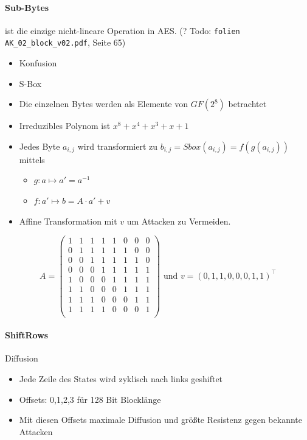 \paragraph{Sub-Bytes} ist die einzige nicht-lineare Operation in AES. (? Todo: \verb|folien AK_02_block_v02.pdf|, Seite 65)

\begin{itemize}
    \item Konfusion
    \item S-Box 
    \item Die einzelnen Bytes werden als Elemente von $GF(2^8)$ betrachtet
    \item Irreduzibles Polynom ist $x^8 + x^4 + x^3 + x + 1$
    \item Jedes Byte $a_{i,j}$ wird transformiert zu $b_{i,j} = Sbox(a_{i, j}) = f(g(a_{i,j}))$ mittels 
    \begin{itemize}
        \item $g: a \mapsto a' = a^{-1}$
        \item $f: a' \mapsto b = A\cdot a' + v$
    \end{itemize}
    \item Affine Transformation mit $v$ um Attacken zu Vermeiden. 
\end{itemize}

\begin{equation*}
    A = \begin{pmatrix}
        1 & 1 & 1 & 1 & 1 & 0 & 0 & 0\\
        0 & 1 & 1 & 1 & 1 & 1 & 0 & 0\\
        0 & 0 & 1 & 1 & 1 & 1 & 1 & 0\\
        0 & 0 & 0 & 1 & 1 & 1 & 1 & 1\\
        1 & 0 & 0 & 0 & 1 & 1 & 1 & 1\\
        1 & 1 & 0 & 0 & 0 & 1 & 1 & 1\\
        1 & 1 & 1 & 0 & 0 & 0 & 1 & 1\\
        1 & 1 & 1 & 1 & 0 & 0 & 0 & 1\\
\end{pmatrix} \text{ und } v = (0,1,1,0,0,0,1,1)^\top
\end{equation*}

\paragraph{ShiftRows}

Diffusion
\begin{itemize}
    \item Jede Zeile des States wird zyklisch nach links geshiftet
    \item Offsets: 0,1,2,3 für 128 Bit Blocklänge
    \item Mit diesen Offsets maximale Diffusion und größte Resistenz gegen bekannte Attacken
\end{itemize}

